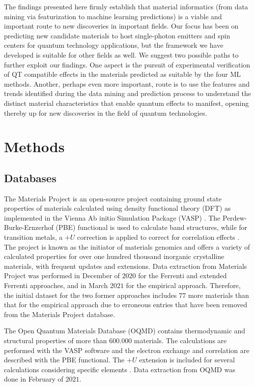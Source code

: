 \documentclass[superscriptaddress,unsortedaddress,
 amsmath,amssymb,
 aps,
]{revtex4-2}
\begin{document}
The findings presented here firmly establish that material informatics (from data mining via featurization to machine learning predictions) is a viable and important route to new discoveries in important fields.  Our focus has been on predicting new candidate materials to host single-photon emitters and spin centers for quantum technology applications, but the framework we have developed is suitable for other fields as well. We suggest two possible paths to further exploit our findings. One aspect is the pursuit of experimental verification of QT compatible effects in the materials predicted as suitable by the four ML methods. Another, perhaps even more important, route is to use the features and trends identified during the data mining and prediction process to understand the distinct material characteristics that enable quantum effects to manifest, opening  thereby up for new discoveries in the field of quantum technologies. 


\section*{Methods}

\subsection*{Databases}
The Materials Project \cite{Jain2013, Jain2018} is an open-source project containing ground state properties of materials calculated using density functional theory (DFT) as implemented in the Vienna Ab initio Simulation Package (VASP) \cite{Kresse1996}. The Perdew-Burke-Ernzerhof \cite{Perdew1996} (PBE) functional is used to calculate band structures, while for transition metals, a $+U$ correction is applied to correct for correlation effects \cite{Wang2006}. The project is known as the initiator of materials genomics and offers a variety of calculated properties for over one hundred thousand inorganic crystalline materials, with frequent updates and extensions. Data extraction from Materials Project was performed in December of $2020$ for the Ferrenti and extended Ferrenti approaches, and in March $2021$ for the empirical approach. Therefore, the initial dataset for the two former approaches includes $77$ more materials than that for the empirical approach due to erroneous entries that have been removed from the Materials Project database.

The Open Quantum Materials Database (OQMD) \cite{Saal2013, Kirklin2015} contains thermodynamic and structural properties of more than $600.000$  materials. The calculations are performed with the VASP software and the electron exchange and correlation are described with the PBE functional. The $+U$ extension is included for several calculations considering specific elements \cite{Stevanovic2012}. Data extraction from OQMD was done in February of $2021$. 
\end{document}
